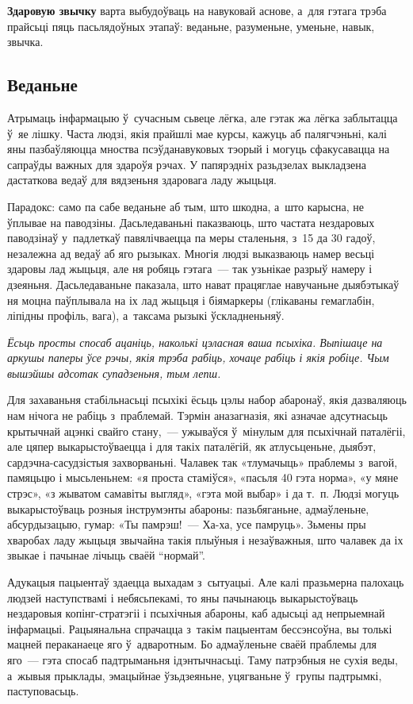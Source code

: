 \textbf{Здаровую звычку }варта выбудоўваць на навуковай аснове, а~для гэтага трэба прайсьці пяць пасьлядоўных этапаў: веданьне, разуменьне, уменьне, навык, звычка.

\subsection*{Веданьне}

Атрымаць інфармацыю ў~сучасным сьвеце лёгка, але гэтак жа лёгка заблытацца ў~яе лішку. Часта людзі, якія прайшлі мае курсы, кажуць аб палягчэньні, калі яны пазбаўляюцца мноства псэўданавуковых тэорый і могуць сфакусавацца на сапраўды важных для здароўя рэчах. У папярэдніх разьдзелах выкладзена дастаткова ведаў для вядзеньня здаровага ладу жыцьця.

Парадокс: само па сабе веданьне аб тым, што шкодна, а~што карысна, не ўплывае на паводзіны. Дасьледаваньні паказваюць, што частата нездаровых паводзінаў у~падлеткаў павялічваецца па меры сталеньня, з~15 да 30 гадоў, незалежна ад ведаў аб яго рызыках. Многія людзі выказваюць намер весьці здаровы лад жыцьця, але ня робяць гэтага~--- так узьнікае разрыў намеру і дзеяньня. Дасьледаваньне паказала, што нават працяглае навучаньне дыябэтыкаў ня моцна паўплывала на іх лад жыцьця і біямаркеры (глікаваны гемаглабін, ліпідны профіль, вага), а~таксама рызыкі ўскладненьняў.

\emph{Ёсьць просты спосаб ацаніць, наколькі цэласная ваша псыхіка. Выпішаце на аркушы паперы ўсе рэчы, якія трэба рабіць, хочаце рабіць і якія робіце. Чым вышэйшы адсотак супадзеньня, тым лепш.}

Для захаваньня стабільнасьці псыхікі ёсьць цэлы набор абаронаў, якія дазваляюць нам нічога не рабіць з~праблемай. Тэрмін аназагназія, які азначае адсутнасьць крытычнай ацэнкі свайго стану,~--- ужываўся ў~мінулым для псыхічнай паталёгіі, але цяпер выкарыстоўваецца і для такіх паталёгій, як атлусьценьне, дыябэт, сардэчна-сасудзістыя захворваньні. Чалавек так «тлумачыць» праблемы з~вагой, памяцьцю і мысьленьнем: «я проста стаміўся», «пасьля 40 гэта норма», «у мяне стрэс», «з жыватом самавіты выгляд», «гэта мой выбар» і да т.~п. Людзі могуць выкарыстоўваць розныя інструмэнты абароны: пазьбяганьне, адмаўленьне, абсурдызацыю, гумар: «Ты памрэш!~--- Ха-ха, усе памруць». Зьмены пры хваробах ладу жыцьця звычайна такія плыўныя і незаўважныя, што чалавек да іх звыкае і пачынае лічыць сваёй ``нормай''. 

Адукацыя пацыентаў здаецца выхадам з~сытуацыі. Але калі празьмерна палохаць людзей наступствамі і небясьпекамі, то яны пачынаюць выкарыстоўваць нездаровыя копінг-стратэгіі і псыхічныя абароны, каб адысьці ад непрыемнай інфармацыі. Рацыянальна спрачацца з~такім пацыентам бессэнсоўна, вы толькі мацней пераканаеце яго ў~адваротным. Бо адмаўленьне сваёй праблемы для яго~--- гэта спосаб падтрыманьня ідэнтычнасьці. Таму патрэбныя не сухія веды, а~жывыя прыклады, эмацыйнае ўзьдзеяньне, уцягваньне ў~групы падтрымкі, паступовасьць.

